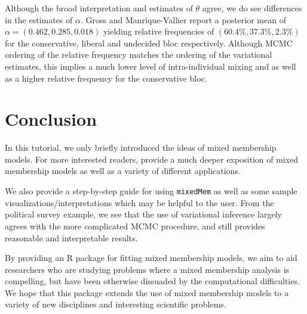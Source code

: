 \documentclass{article}\usepackage[]{graphicx}\usepackage[]{color}
\begin{document}
Although the broad interpretation and estimates of $\theta$ agree, we do see differences in the estimates of $\alpha$. Gross and Manrique-Vallier report a posterior mean of $\alpha = \left(0.462, 0.285, 0.01 8\right)$ yielding relative frequencies of $\left(60.4\%, 37.3\%, 2.3\%\right)$ for the conservative, liberal and undecided bloc respectively. Although MCMC ordering of the relative frequency matches the ordering of the variational estimates, this implies a much lower level of intra-individual mixing and as well as a higher relative frequency for the conservative bloc.

\section{Conclusion} \label{conclusion}
In this tutorial, we only briefly introduced the ideas of mixed membership models. For more interested readers, \cite{Airoldi2014Handbook} provide a much deeper exposition of mixed membership models as well as a variety of different applications. 

We also provide a step-by-step guide for using \texttt{mixedMem} as well as some sample visualizations/interpretations which may be helpful to the user. From the political survey example, we see that the use of variational inference largely agrees with the more complicated MCMC procedure, and still provides reasonable and interpretable results.

By providing an R package for fitting mixed membership models, we aim to aid researchers who are studying problems where a mixed membership analysis is compelling, but have been otherwise dissuaded by the computational difficulties. We hope that this package extends the use of mixed membership models to a variety of new disciplines and interesting scientific problems.



\end{document}
